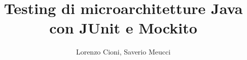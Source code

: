 \documentclass[12pt,a4paper,oneside,italian]{book}
\author{Lorenzo Cioni, Saverio Meucci}
\title{\textbf{Testing di microarchitetture Java con JUnit e Mockito}}
\begin{document}
\frontmatter
\maketitle  	%

\tableofcontents


\mainmatter{






}

\end{document}
